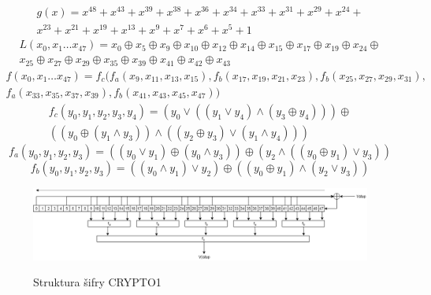 \begin{multline}
    \label{generatingPolynomial}
    g(x) = x^{48} + x^{43} + x^{39} + x^{38} + x^{36} + x^{34} + x^{33} + x^{31} + x^{29} + x^{24} + \\
     x^{23} + x^{21} + x^{19} + x^{13} + x^{9} + x^{7} + x^{6} + x^{5} + 1  %
\end{multline}
\begin{multline}
    \label{feedbackFunction}
    L(x_0, x_1 \dots x_{47}) = x_{0} \oplus x_{5} \oplus x_{9} \oplus x_{10} \oplus x_{12} \oplus x_{14} \oplus x_{15} \oplus x_{17} \oplus x_{19} \oplus x_{24} \oplus \\ 
    x_{25} \oplus x_{27} \oplus x_{29} \oplus x_{35} \oplus x_{39} \oplus x_{41} \oplus x_{42} \oplus x_{43}
\end{multline}
\begin{multline}
    \label{filterFunction}
    f(x_0, x_1 \dots x_{47}) = f_c(f_a(x_{9},x_{11},x_{13},x_{15}),
                               f_b(x_{17},x_{19},x_{21},x_{23}),
                               f_b(x_{25},x_{27},x_{29},x_{31}), \\
                               f_a(x_{33},x_{35},x_{37},x_{39}),
                               f_b(x_{41},x_{43},x_{45},x_{47}))
\end{multline}
\begin{multline}
    \label{filterFunctionC}
    f_c(y_0,y_1,y_2,y_3,y_4) = 
    (y_0 \lor ((y_1 \lor y_4) \land (y_3 \oplus y_4))) \oplus \\
    ((y_0 \oplus(y_1 \land y_3)) \land ((y_2 \oplus y_3) \lor (y_1\land y_4)))
\end{multline}
\begin{equation}
    \label{filterFunctionA}
    f_a(y_0,y_1,y_2,y_3) = 
    ((y_0 \lor y_1) \oplus (y_0 \land y_3)) \oplus (y_2 \land ((y_0 \oplus y_1) \lor y_3))
\end{equation}
\begin{equation}
    \label{filterFunctionB}
    f_b(y_0,y_1,y_2,y_3) = ((y_0 \land y_1) \lor y_2) \oplus ((y_0 \oplus y_1) \land (y_2 \lor y_3))
\end{equation}

\begin{figure}[ht]\centering
  \centering
  \hspace*{-0.08\linewidth}
  \includegraphics[width=\linewidth]{obrazky-figures/StrukturaSifry.png}\\[1pt]  
  \caption{Struktura šifry CRYPTO1\cite{Wirelessly_Pickpocketing}}    
  \label{obrazekStrukturaSifry}
\end{figure}

